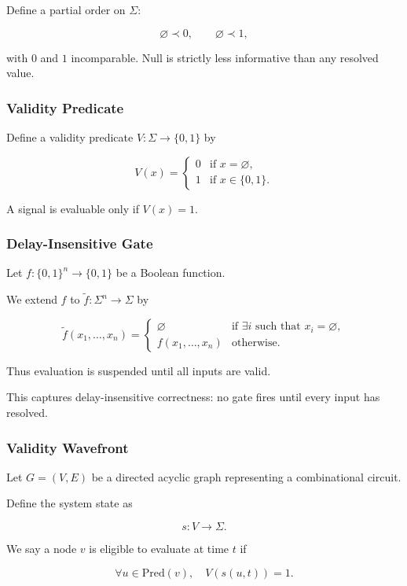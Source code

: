 \documentclass[12pt]{article}
\begin{document}
Define a partial order on $\Sigma$:

\[
\varnothing \prec 0, \qquad \varnothing \prec 1,
\]

with $0$ and $1$ incomparable. Null is strictly less informative than any resolved value.

\subsubsection*{Validity Predicate}

Define a validity predicate $V : \Sigma \to \{0,1\}$ by

\[
V(x) =
\begin{cases}
0 & \text{if } x = \varnothing, \\
1 & \text{if } x \in \{0,1\}.
\end{cases}
\]

A signal is evaluable only if $V(x)=1$.

\subsubsection*{Delay-Insensitive Gate}

Let $f : \{0,1\}^n \to \{0,1\}$ be a Boolean function.

We extend $f$ to $\tilde{f} : \Sigma^n \to \Sigma$ by

\[
\tilde{f}(x_1,\dots,x_n) =
\begin{cases}
\varnothing & \text{if } \exists i \text{ such that } x_i = \varnothing, \\
f(x_1,\dots,x_n) & \text{otherwise}.
\end{cases}
\]

Thus evaluation is suspended until all inputs are valid.

This captures delay-insensitive correctness: no gate fires until every input has resolved.

\subsubsection*{Validity Wavefront}

Let $G = (V,E)$ be a directed acyclic graph representing a combinational circuit.

Define the system state as

\[
s : V \to \Sigma.
\]

We say a node $v$ is eligible to evaluate at time $t$ if

\[
\forall u \in \text{Pred}(v), \quad V(s(u,t)) = 1.
\]
\end{document}
